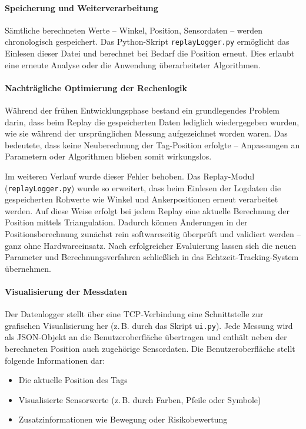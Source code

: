 \documentclass[a4paper, 12pt]{article} %
\begin{document}
\paragraph{Speicherung und Weiterverarbeitung}

Sämtliche berechneten Werte – Winkel, Position, Sensordaten – werden chronologisch gespeichert. Das Python-Skript \texttt{replayLogger.py} 
ermöglicht das Einlesen dieser Datei und berechnet bei Bedarf die Position erneut. Dies erlaubt eine erneute Analyse oder die Anwendung überarbeiteter 
Algorithmen.

\paragraph{Nachträgliche Optimierung der Rechenlogik}

Während der frühen Entwicklungsphase bestand ein grundlegendes Problem darin, dass beim Replay die gespeicherten Daten lediglich wiedergegeben wurden, wie sie während der ursprünglichen Messung aufgezeichnet worden waren. Das bedeutete, dass keine Neuberechnung der Tag-Position erfolgte – Anpassungen an Parametern oder Algorithmen blieben somit wirkungslos. 

Im weiteren Verlauf wurde dieser Fehler behoben. Das Replay-Modul (\texttt{replayLogger.py}) wurde so erweitert, dass beim Einlesen der Logdaten die gespeicherten Rohwerte wie Winkel und Ankerpositionen erneut verarbeitet werden. Auf diese Weise erfolgt bei jedem Replay eine aktuelle Berechnung der Position mittels Triangulation. Dadurch können Änderungen in der Positionsberechnung zunächst rein softwareseitig überprüft und validiert werden – ganz ohne Hardwareeinsatz. Nach erfolgreicher Evaluierung lassen sich die neuen Parameter und Berechnungsverfahren schließlich in das Echtzeit-Tracking-System übernehmen.

\paragraph{Visualisierung der Messdaten}

Der Datenlogger stellt über eine TCP-Verbindung eine Schnittstelle zur grafischen Visualisierung her (z.\,B. durch das Skript \texttt{ui.py}). 
Jede Messung wird als \ac{JSON}-Objekt an die Benutzeroberfläche übertragen und enthält neben der berechneten Position auch zugehörige Sensordaten. 
Die Benutzeroberfläche stellt folgende Informationen dar:

\begin{itemize}
    \item Die aktuelle Position des Tags
    \item Visualisierte Sensorwerte (z.\,B. durch Farben, Pfeile oder Symbole)
    \item Zusatzinformationen wie Bewegung oder Risikobewertung
\end{itemize}
\end{document}
